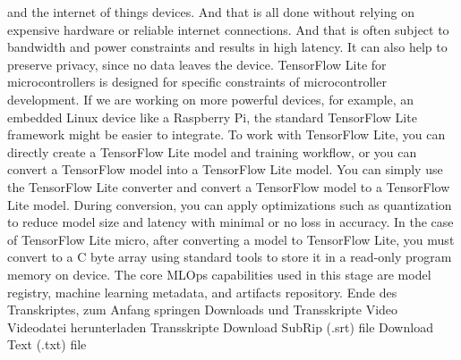 {{{{{    and the internet of things devices.
    And that is all done without relying on expensive hardware or reliable internet
    connections.
    And that is often subject to bandwidth and power constraints and results
    in high latency.
    It can also help to preserve privacy, since no data leaves the device.
    TensorFlow Lite for microcontrollers is designed for specific constraints
    of microcontroller development.
    If we are working on more powerful devices,
    for example, an embedded Linux device like a Raspberry Pi,
    the standard TensorFlow Lite framework might be easier to integrate.
    To work with TensorFlow Lite, you can directly create a TensorFlow Lite model
    and training workflow, or you can convert a TensorFlow model
    into a TensorFlow Lite model.
    You can simply use the TensorFlow Lite converter
    and convert a TensorFlow model to a TensorFlow Lite model.
    During conversion, you can apply optimizations such as quantization
    to reduce model size and latency with minimal or no loss in accuracy.
    In the case of TensorFlow Lite micro, after converting a model
    to TensorFlow Lite, you must convert to a C byte
    array using standard tools to store it in a read-only program
    memory on device.
    The core MLOps capabilities used in this stage
    are model registry, machine learning metadata, and artifacts repository.
    Ende des Transkriptes, zum Anfang springen
    Downloads und Transskripte
    Video
    Videodatei herunterladen
    Transskripte
    Download SubRip (.srt) file
    Download Text (.txt) file 

}}}}}
